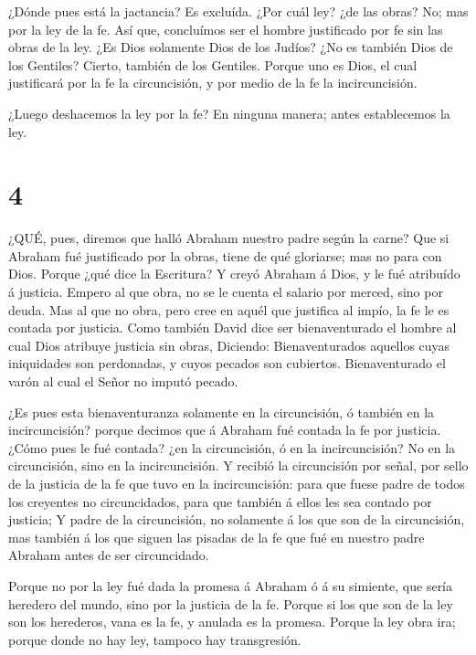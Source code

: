  ¿Dónde pues está la jactancia? Es excluída. ¿Por cuál ley?
¿de las obras? No; mas por la ley de la fe.  Así que,
concluímos ser el hombre justificado por fe sin las obras de la ley.
 ¿Es Dios solamente Dios de los Judíos? ¿No es también Dios
de los Gentiles? Cierto, también de los Gentiles.  Porque
uno es Dios, el cual justificará por la fe la circuncisión, y por medio
de la fe la incircuncisión.

 ¿Luego deshacemos la ley por la fe? En ninguna manera;
antes establecemos la ley.

\hypertarget{section-3}{%
\section{4}\label{section-3}}

 ¿QUÉ, pues, diremos que halló Abraham nuestro padre según
la carne?  Que si Abraham fué justificado por la obras,
tiene de qué gloriarse; mas no para con Dios.  Porque ¿qué
dice la Escritura? Y creyó Abraham á Dios, y le fué atribuído á
justicia.  Empero al que obra, no se le cuenta el salario
por merced, sino por deuda.  Mas al que no obra, pero cree
en aquél que justifica al impío, la fe le es contada por justicia.
 Como también David dice ser bienaventurado el hombre al
cual Dios atribuye justicia sin obras,  Diciendo:
Bienaventurados aquellos cuyas iniquidades son perdonadas, y cuyos
pecados son cubiertos.  Bienaventurado el varón al cual el
Señor no imputó pecado.

 ¿Es pues esta bienaventuranza solamente en la circuncisión,
ó también en la incircuncisión? porque decimos que á Abraham fué contada
la fe por justicia.  ¿Cómo pues le fué contada? ¿en la
circuncisión, ó en la incircuncisión? No en la circuncisión, sino en la
incircuncisión.  Y recibió la circuncisión por señal, por
sello de la justicia de la fe que tuvo en la incircuncisión: para que
fuese padre de todos los creyentes no circuncidados, para que también á
ellos les sea contado por justicia;  Y padre de la
circuncisión, no solamente á los que son de la circuncisión, mas también
á los que siguen las pisadas de la fe que fué en nuestro padre Abraham
antes de ser circuncidado.

 Porque no por la ley fué dada la promesa á Abraham ó á su
simiente, que sería heredero del mundo, sino por la justicia de la fe.
 Porque si los que son de la ley son los herederos, vana es
la fe, y anulada es la promesa.  Porque la ley obra ira;
porque donde no hay ley, tampoco hay transgresión.

